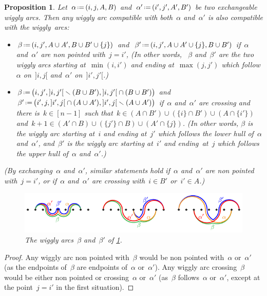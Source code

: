 \documentclass{amsart}
\newtheorem{proposition}[theorem]{Proposition}
\theoremstyle{definition}
\newcommand{\ssm}{\smallsetminus} %
\newcommand{\eqdef}{\mbox{\,\raisebox{0.2ex}{\scriptsize\ensuremath{\mathrm:}}\ensuremath{=}\,}} %
\begin{document}
\begin{proposition}
\label{prop:uerp}
Let~$\alpha \eqdef (i, j, A, B)$ and~$\alpha' \eqdef (i', j', A', B')$ be two exchangeable wiggly arcs.
Then any wiggly arc compatible with both~$\alpha$ and~$\alpha'$ is also compatible with the wiggly~arcs:
\begin{itemize}
\item $\beta \eqdef (i, j', A \cup A', B \cup B' \cup \{j\})$ and~$\beta' \eqdef (i, j', A \cup A' \cup \{j\}, B \cup B')$ if~$\alpha$ and~$\alpha'$ are non pointed with~$j = i'$,
(In other words, ~$\beta$ and~$\beta'$ are the two wiggly arcs starting at~$\min(i,i')$ and ending at~$\max(j,j')$ which follow $\alpha$ on~$]i,j[$ and~$\alpha'$ on~$]i',j'[$.)
\item $\beta \eqdef \big( i, j', {]i,j'[} \ssm (B \cup B'), {]i,j'[} \cap (B \cup B') \big)$ and~$\beta' \eqdef \big( i', j, {]i',j[} \cap (A \cup A'), {]i',j[} \ssm (A \cup A') \big)$ if~$\alpha$ and~$\alpha'$ are crossing and there is~$k \in [n-1]$ such that~$k \in (A \cap B') \cup (\{i\} \cap B') \cup (A \cap \{i'\})$ and~$k+1 \in (A' \cap B) \cup (\{j'\} \cap B) \cup (A' \cap \{j\})$.
(In other words, $\beta$ is the wiggly arc starting at~$i$ and ending at~$j'$ which follows the lower hull of~$\alpha$ and~$\alpha'$, and~$\beta'$ is the wiggly arc starting at~$i'$ and ending~at~$j$ which follows the upper hull of~$\alpha$ and~$\alpha'$.)
\end{itemize}
(By exchanging~$\alpha$ and~$\alpha'$, similar statements hold if~$\alpha$ and~$\alpha'$ are non pointed with~$j = i'$, or if~$\alpha$ and~$\alpha'$ are crossing with~$i \in B'$ or~$i' \in A$.)
%
\begin{figure}
\centerline{\includegraphics[scale=1.3]{incompatible3}}
\caption{The wiggly arcs~$\beta$ and~$\beta'$ of \cref{prop:uerp}.}
\label{fig:incompatible3}
\end{figure}
\end{proposition}

\begin{proof}
Any wiggly arc non pointed with~$\beta$ would be non pointed with~$\alpha$ or~$\alpha'$ (as the endpoints of~$\beta$ are endpoints of~$\alpha$ or~$\alpha'$).
Any wiggly arc crossing~$\beta$ would be either non pointed or crossing~$\alpha$ or~$\alpha'$ (as~$\beta$ follows~$\alpha$ or~$\alpha'$, except at the point~$j = i'$ in the first situation).
\end{proof}
\end{document}
